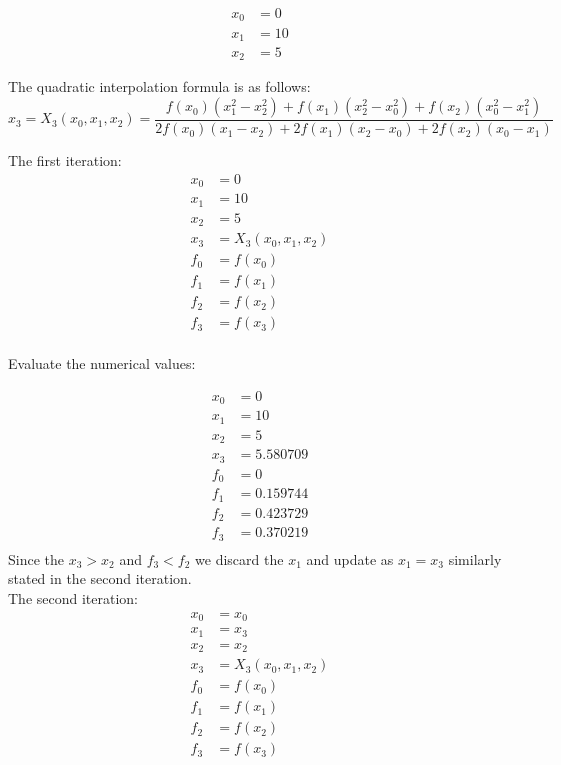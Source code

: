 \documentclass[12pt, a4paper]{article}
\numberwithin{equation}{section}
\begin{document}
\begin{equation}
\begin{align}
x_0 &= 0 \\
x_1 &= 10 \\
x_2 &= 5    
\end{align}
\end{equation}

The quadratic interpolation formula is as follows:
\begin{equation}
    x_3=X_3(x_0,x_1,x_2)=\frac{f\left(x_0\right)\left(x_1^2-x_2^2\right)+f\left(x_1\right)\left(x_2^2-x_0^2\right)+f\left(x_2\right)\left(x_0^2-x_1^2\right)}{2 f\left(x_0\right)\left(x_1-x_2\right)+2 f\left(x_1\right)\left(x_2-x_0\right)+2 f\left(x_2\right)\left(x_0-x_1\right)}
\end{equation}

The first iteration:
\begin{equation}
\begin{align}
x_0 &= 0 \\
x_1 &= 10 \\
x_2 &= 5  \\
x_3 &= X_3(x_0,x_1,x_2)\\
f_0 &= f(x_0) \\
f_1 &= f(x_1) \\
f_2 &= f(x_2) \\
f_3 &= f(x_3) \\
\end{align}
\end{equation}

Evaluate the numerical values:

\begin{equation}
\begin{align}
x_0 &= 0 \\
x_1 &= 10 \\
x_2 &= 5  \\
x_3 &= 5.580709\\
f_0 &= 0 \\
f_1 &= 0.159744 \\
f_2 &= 0.423729 \\
f_3 &= 0.370219 \\
\end{align}
\end{equation}
Since the $x_3 > x_2$ and $f_3 < f_2$ we discard the $x_1$ and update as $x_1 = x_3$ similarly stated in the second iteration.\\
The second iteration:
\begin{equation}
\begin{align}
x_0 &= x_0 \\
x_1 &= x_3 \\
x_2 &= x_2  \\
x_3 &= X_3(x_0,x_1,x_2)\\
f_0 &= f(x_0) \\
f_1 &= f(x_1) \\
f_2 &= f(x_2) \\
f_3 &= f(x_3) \\
\end{align}
\end{equation}
\end{document}

